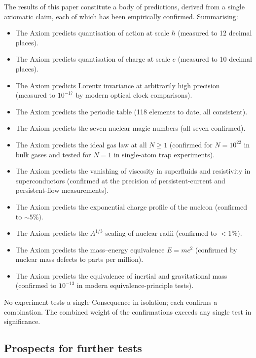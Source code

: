 \documentclass[11pt,twocolumn,a4paper]{article}
\theoremstyle{axiomstyle}
\theoremstyle{conseqstyle}
\theoremstyle{definition}
\theoremstyle{remark}
\begin{document}
The results of this paper constitute a body of predictions, derived from a single axiomatic claim, each of which has been empirically confirmed. Summarising:
\begin{itemize}
\item The Axiom predicts quantisation of action at scale $\hbar$ (measured to 12 decimal places).
\item The Axiom predicts quantisation of charge at scale $e$ (measured to 10 decimal places).
\item The Axiom predicts Lorentz invariance at arbitrarily high precision (measured to $10^{-17}$ by modern optical clock comparisons).
\item The Axiom predicts the periodic table (118 elements to date, all consistent).
\item The Axiom predicts the seven nuclear magic numbers (all seven confirmed).
\item The Axiom predicts the ideal gas law at all $N\ge 1$ (confirmed for $N=10^{22}$ in bulk gases and tested for $N=1$ in single-atom trap experiments).
\item The Axiom predicts the vanishing of viscosity in superfluids and resistivity in superconductors (confirmed at the precision of persistent-current and persistent-flow measurements).
\item The Axiom predicts the exponential charge profile of the nucleon (confirmed to $\sim 5\%$).
\item The Axiom predicts the $A^{1/3}$ scaling of nuclear radii (confirmed to $<1\%$).
\item The Axiom predicts the mass--energy equivalence $E=mc^{2}$ (confirmed by nuclear mass defects to parts per million).
\item The Axiom predicts the equivalence of inertial and gravitational mass (confirmed to $10^{-13}$ in modern equivalence-principle tests).
\end{itemize}

No experiment tests a single Consequence in isolation; each confirms a combination. The combined weight of the confirmations exceeds any single test in significance.

\subsection{Prospects for further tests}
\end{document}
